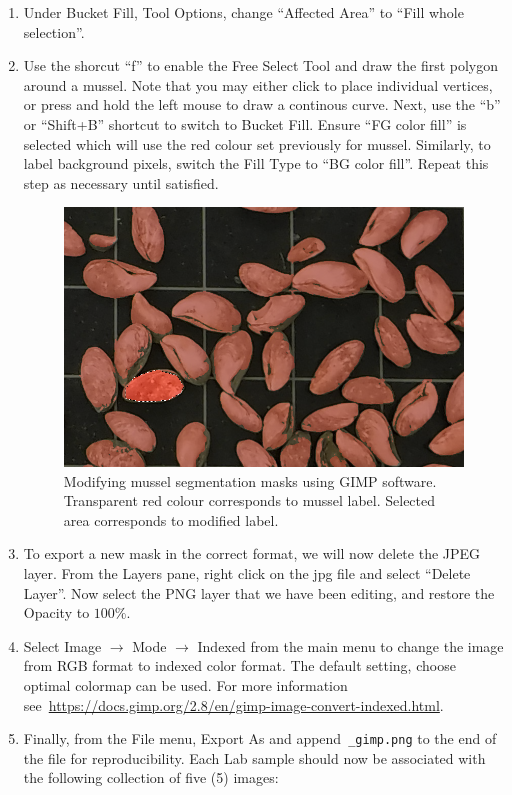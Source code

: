 \documentclass[11pt]{article} %
\begin{document}
\begin{enumerate}
\item Under Bucket Fill, Tool Options, change ``Affected Area'' to ``Fill whole 
selection''.

\item Use the shorcut ``f'' to enable the Free Select Tool and draw the first 
polygon around a mussel. Note that you may either click to place individual
vertices, or press and hold the left mouse to draw a continous curve. Next, use
the ``b'' or ``Shift+B'' shortcut to switch to Bucket Fill. Ensure ``FG color
fill'' is selected which will use the red colour set previously for mussel. 
Similarly, to label background pixels, switch the Fill Type to ``BG color 
fill''. Repeat this step as necessary until satisfied.

\begin{figure}
\centering
\includegraphics[width=0.4\linewidth]{img/GIMP_edit_mask}
\caption{Modifying mussel segmentation masks using GIMP software. Transparent 
red colour corresponds to mussel label. Selected area corresponds to modified 
label.}
\label{fig:gimp-label}
\end{figure}

\item To export a new mask in the correct format, we will now delete the JPEG 
layer. From the Layers pane, right click on the jpg file and select ``Delete
Layer''. Now select the PNG layer that we have been editing, and restore the 
Opacity to $100\%$. 

\item Select Image $\rightarrow$ Mode $\rightarrow$ Indexed from the 
main menu to change the image from RGB format to indexed color 
format. The default setting, choose optimal colormap can be 
used. For more information 
see~\url{https://docs.gimp.org/2.8/en/gimp-image-convert-indexed.html}.

\item Finally, from the File menu, Export As and append~\texttt{\_gimp.png} to 
the end of the file for reproducibility. Each Lab sample should now be 
associated with the following collection of five (5) images:


\end{enumerate}
\end{document}
